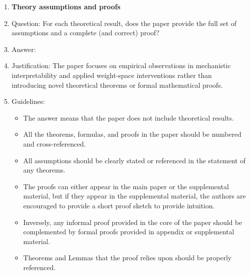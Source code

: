 \documentclass{article}
\begin{document}
\begin{enumerate}
\item {\bf Theory assumptions and proofs}
    \item[] Question: For each theoretical result, does the paper provide the full set of assumptions and a complete (and correct) proof?
    \item[] Answer: \answerNA{}
    \item[] Justification: The paper focuses on empirical observations in mechanistic interpretability and applied weight-space interventions rather than introducing novel theoretical theorems or formal mathematical proofs.
    \item[] Guidelines:
    \begin{itemize}
        \item The answer \answerNA{} means that the paper does not include theoretical results. 
        \item All the theorems, formulas, and proofs in the paper should be numbered and cross-referenced.
        \item All assumptions should be clearly stated or referenced in the statement of any theorems.
        \item The proofs can either appear in the main paper or the supplemental material, but if they appear in the supplemental material, the authors are encouraged to provide a short proof sketch to provide intuition. 
        \item Inversely, any informal proof provided in the core of the paper should be complemented by formal proofs provided in appendix or supplemental material.
        \item Theorems and Lemmas that the proof relies upon should be properly referenced. 
    \end{itemize}


\end{enumerate}
\end{document}
